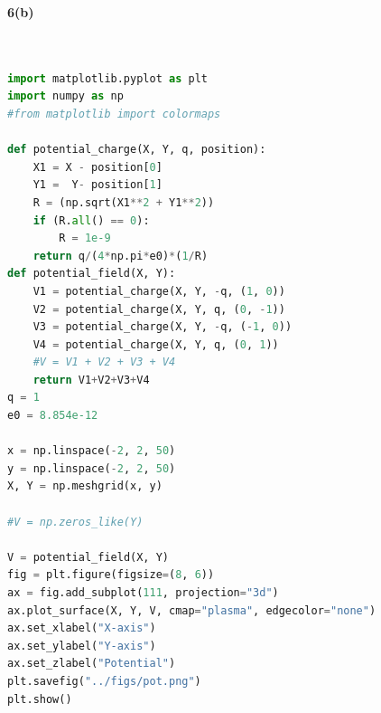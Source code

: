 \documentclass{article}
\begin{document}
\textbf{6(b)}
\begin{lstlisting}[language=Python]


import matplotlib.pyplot as plt
import numpy as np
#from matplotlib import colormaps

def potential_charge(X, Y, q, position):
    X1 = X - position[0]
    Y1 =  Y- position[1]
    R = (np.sqrt(X1**2 + Y1**2))
    if (R.all() == 0):
        R = 1e-9
    return q/(4*np.pi*e0)*(1/R)
def potential_field(X, Y):
    V1 = potential_charge(X, Y, -q, (1, 0))
    V2 = potential_charge(X, Y, q, (0, -1))
    V3 = potential_charge(X, Y, -q, (-1, 0))
    V4 = potential_charge(X, Y, q, (0, 1))
    #V = V1 + V2 + V3 + V4
    return V1+V2+V3+V4
q = 1
e0 = 8.854e-12

x = np.linspace(-2, 2, 50)
y = np.linspace(-2, 2, 50)
X, Y = np.meshgrid(x, y)

#V = np.zeros_like(Y)

V = potential_field(X, Y)
fig = plt.figure(figsize=(8, 6))
ax = fig.add_subplot(111, projection="3d")
ax.plot_surface(X, Y, V, cmap="plasma", edgecolor="none")
ax.set_xlabel("X-axis")
ax.set_ylabel("Y-axis")
ax.set_zlabel("Potential")
plt.savefig("../figs/pot.png")
plt.show()

\end{lstlisting}
\end{document}
